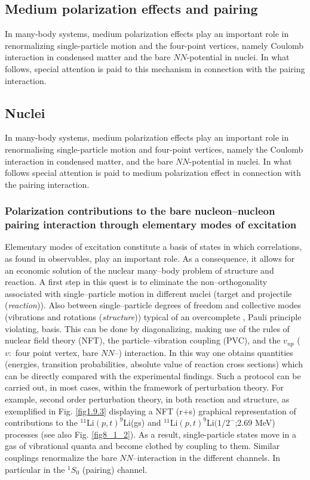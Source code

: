 \begin{subappendices}
\section{Medium polarization effects and pairing}\label{C3AppEx}
In many-body systems, medium polarization effects play an important role in renormalizing single-particle motion and the four-point vertices, namely Coulomb interaction in condensed matter and the bare $NN$-potential in nuclei. In what follows, special attention is paid to this mechanism in connection with the pairing interaction.
\subsection{Nuclei}
In many-body systems, medium polarization effects play an important role in renormalising single-particle motion and four-point vertices, namely the Coulomb interaction in condensed matter, and the bare $NN$-potential in nuclei. In what follows special attention is paid to medium polarization effect in connection with the pairing interaction. 
\subsubsection{Polarization contributions to the bare nucleon--nucleon pairing interaction through elementary modes of excitation}
Elementary modes of excitation constitute a basis of states in which correlations, as found in observables, play an important role. As a consequence, it allows for an economic solution of the nuclear many--body problem of structure and reaction. A first step in this quest is to eliminate the non--orthogonality associated with single--particle motion in different nuclei (target and projectile (\textit{reaction})). Also between single--particle degrees of freedom and collective modes (vibrations and rotations (\textit{structure})) typical of an overcomplete , Pauli principle violating, basis. This can be done by diagonalizing, making use of the rules of nuclear field theory (NFT), the particle--vibration coupling (PVC), and the $v_{np}$ ($v:$ four point vertex, bare $NN$--) interaction. In this way one obtains quantities (energies, transition probabilities, absolute value of reaction cross sections) which can be directly compared with the experimental findings.
Such a protocol can be carried out, in most cases, within the framework of  perturbation theory. For example, second order perturbation theory, in both reaction and structure, as exemplified in Fig. \ref{fig1.9.3} displaying a NFT (r+s) graphical representation of contributions to the $^{11}$Li$(p,t)^{9}$Li(gs) and $^{11}$Li$(p,t)^{9}$Li$(1/2^-$;2.69 MeV) processes (see also Fig. \ref{fig8_1_2}).
As a result, single-particle states move in a gas of vibrational quanta and become clothed by coupling to them. Similar couplings renormalize the bare $NN$--interaction in the different channels. In particular in the $^1S_0$ (pairing) channel.



\end{subappendices}
